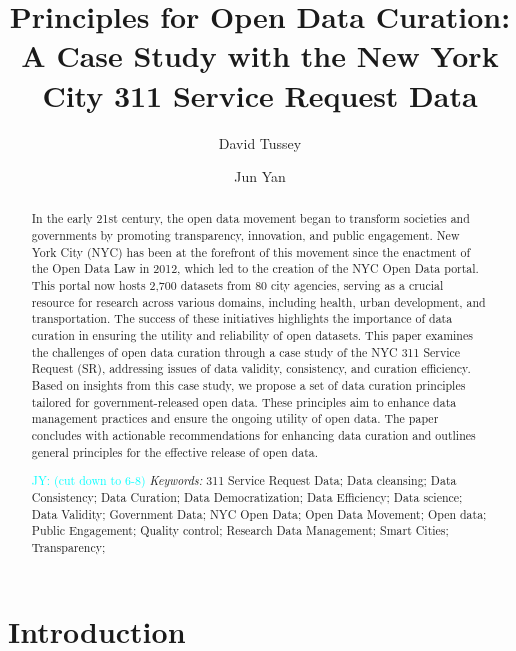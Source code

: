 \documentclass[12pt, titlepage]{article}
\title{Principles for Open Data Curation: A Case Study with the New
York City 311 Service Request Data}
\author[1]{David Tussey}
\author[2]{Jun Yan}
\affil[1]{Former Executive Director, NYC DoITT}
\affil[2]{Department of Statistics, University of Connecticut}
\newcommand{\jy}[1]{\textcolor{cyan}{JY: (#1)}}
\begin{document}
\maketitle



\begin{abstract}
In the early 21st century, the open data movement began to transform 
societies and governments by promoting transparency,
innovation, and public engagement. New York City (NYC) has been at
the forefront of this movement since the enactment of the Open 
Data Law in 2012, which led to the creation of the NYC Open Data
portal. This portal now hosts 2,700 datasets from 80 city agencies,
serving as a crucial resource for research across various domains, 
including health, urban development, and transportation. The 
success of these initiatives highlights the importance of data 
curation in ensuring the utility and reliability of open datasets.
This paper examines the challenges of open data curation through a
case study of the NYC 311 Service Request (SR), addressing issues 
of data validity, consistency, and curation efficiency. Based on 
insights from this case study, we propose a set of data curation 
principles tailored for government-released open data. These principles 
aim to enhance data management practices and ensure 
the ongoing utility of open data. The paper concludes with 
actionable recommendations for enhancing data curation and outlines
general principles for the effective release of open data.

\bigskip

\jy{cut down to 6-8}
\noindent
\textit{Keywords:}
	311 Service Request Data;
	Data cleansing;
	Data Consistency;
	Data Curation;
	Data Democratization;
	Data Efficiency;
	Data science;
	Data Validity;
	Government Data;
	NYC Open Data;
	Open Data Movement;
	Open data;
	Public Engagement;
	Quality control;
	Research Data Management;
	Smart Cities;
	Transparency;
\end{abstract}

\doublespacing

\section{Introduction} 
\label{sec:intro}
\end{document}
